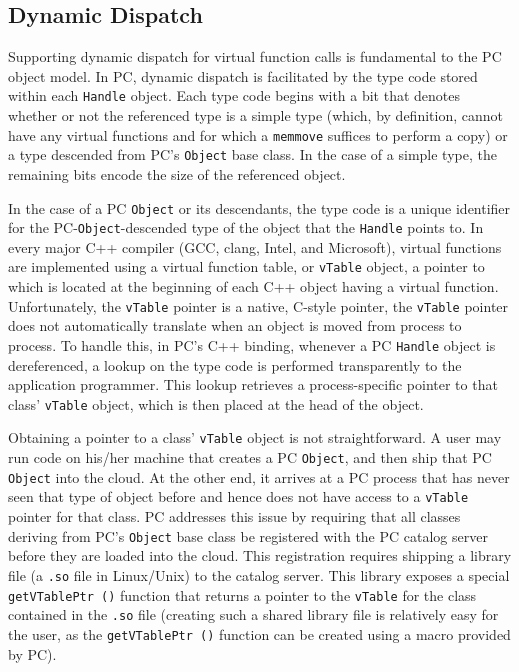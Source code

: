 \subsection{Dynamic Dispatch}
\label{sec:dyn_dis}

Supporting dynamic dispatch for virtual function calls is fundamental to the PC object model.
In PC, dynamic dispatch is facilitated by the type code stored within each
\texttt{Handle} object.
Each type code begins with a bit that denotes whether or not the referenced type is a simple type (which, by definition, cannot have any
virtual functions and for which a \texttt{memmove} suffices to perform a copy) or a type descended from PC's \texttt{Object} base class.
In the case of a simple type, the remaining bits encode the size of the referenced object.  

In the case of a PC \texttt{Object} or its descendants, the
type code is a unique identifier for the PC-\texttt{Object}-descended type of the object that the \texttt{Handle} points to.
In every major C++ compiler (GCC, clang, Intel, and Microsoft), virtual functions
are implemented using a virtual function table, or \texttt{vTable} object, a pointer to which is located at the beginning
of each C++ object having a virtual function.  Unfortunately, the \texttt{vTable} pointer is a native, C-style pointer, the
\texttt{vTable} pointer does not automatically translate when an
object is moved from process to process.  To handle this, in
PC's C++ binding, whenever a PC \texttt{Handle} object is dereferenced, 
a lookup on the
type code is performed transparently to the application programmer.  This lookup retrieves a process-specific pointer to that class' \texttt{vTable} object, which is
then placed at the head of the object.

Obtaining a pointer to a class' \texttt{vTable} object is not straightforward.
A user may run code on his/her machine that creates
a PC \texttt{Object}, and then ship that PC \texttt{Object} into the cloud.  At the other end, it arrives at a PC process that has never seen that type of object before and hence
does not have access to a \texttt{vTable} pointer for that class.
PC addresses this issue by requiring that all classes deriving from PC's \texttt{Object} base class be registered with the PC catalog
server before they are loaded into the cloud.  This registration requires shipping a library file (a \texttt{.so} file in Linux/Unix) to
the catalog server.  This library exposes a special \texttt{getVTablePtr ()} function that returns a pointer to the \texttt{vTable} for the class contained
in the \texttt{.so} file (creating such
a shared library file is relatively easy for the user, as the \texttt{getVTablePtr ()} function can be created using a macro provided by PC).

